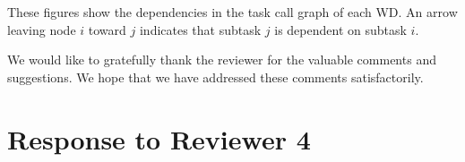 \documentclass[12pt,draftclsnofoot,onecolumn]{IEEEtran}
\newcommand{\rev}[1]{{\color{blue}#1}} %
\newcommand{\rev}[1]{#1}
\newenvironment{my}[2]%
{\begin{list}{}%
{\setlength{\rightmargin}{#1}\setlength{\leftmargin}{#2}}%


 \item[]{}

} {\end{list}}
\begin{document}
\begin{enumerate}
\begin{my}{1cm}{1cm}
	\rev{
		These figures show the dependencies in the task call graph of each WD. An arrow leaving node $i$ toward $j$ indicates that subtask $j$ is dependent on subtask $i$.
	}\newline
\end{my}

\end{enumerate}

We would like to gratefully thank the reviewer for the valuable comments and suggestions. We hope that we have addressed these comments satisfactorily.\newline

\section{Response to Reviewer 4}
\end{document}
